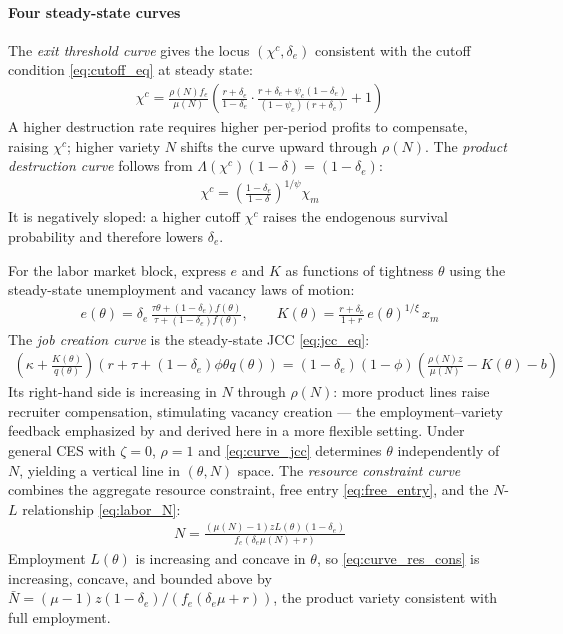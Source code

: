 \documentclass[authoryear, review, 12pt]{elsarticle}
\begin{document}
\paragraph{Four steady-state curves}
The \emph{exit threshold curve} gives the locus 
$(\chi^c, \delta_e)$ consistent with the cutoff 
condition \eqref{eq:cutoff_eq} at steady state:
\begin{align}\label{eq:exit_threshold_curve}
	\chi^c = \frac{\rho(N) f_e}{\mu(N)}
	\left(\frac{r+\delta_e}{1-\delta_e}
	\cdot\frac{r+\delta_e+\psi_c(1-\delta_e)}
	{(1-\psi_c)(r+\delta_e)}+1\right)
\end{align}
A higher destruction rate requires higher per-period 
profits to compensate, raising $\chi^c$; higher variety 
$N$ shifts the curve upward through $\rho(N)$. The 
\emph{product destruction curve} follows from 
$\Lambda(\chi^c)(1-\delta) = (1-\delta_e)$:
\begin{align}\label{eq:destruction_curve}
	\chi^c = \left(\frac{1-\delta_e}{1-\delta}
	\right)^{1/\psi}\chi_m
\end{align}
It is negatively sloped: a higher cutoff $\chi^c$ 
raises the endogenous survival probability and 
therefore lowers $\delta_e$.

For the labor market block, express $e$ and $K$ as 
functions of tightness $\theta$ using the steady-state 
unemployment and vacancy laws of motion:
\begin{align}\label{eq:e_theta}
	e(\theta) = \delta_e\,
	\frac{\tau\theta + (1-\delta_e)f(\theta)}
	{\tau + (1-\delta_e)f(\theta)}, \qquad
	K(\theta) = \frac{r+\delta_e}{1+r}\,
	e(\theta)^{1/\xi}\,x_m
\end{align}
The \emph{job creation curve} is the steady-state JCC 
\eqref{eq:jcc_eq}:
\begin{align}\label{eq:curve_jcc}
	\left(\kappa+\frac{K(\theta)}{q(\theta)}\right)
	\left(r+\tau+(1-\delta_e)\phi\theta q(\theta)\right)
	= (1-\delta_e)(1-\phi)
	\left(\frac{\rho(N)z}{\mu(N)}-K(\theta)-b\right)
\end{align}
Its right-hand side is increasing in $N$ through 
$\rho(N)$: more product lines raise recruiter 
compensation, stimulating vacancy creation --- the 
employment--variety feedback emphasized by 
\citet{schaal_2019} and derived here in a more 
flexible setting. Under general CES with $\zeta=0$, 
$\rho=1$ and \eqref{eq:curve_jcc} determines $\theta$ 
independently of $N$, yielding a vertical line in 
$(\theta,N)$ space. The \emph{resource constraint 
	curve} combines the aggregate resource constraint, 
free entry \eqref{eq:free_entry}, and the $N$-$L$ 
relationship \eqref{eq:labor_N}:
\begin{align}\label{eq:curve_res_cons}
	N = \frac{(\mu(N)-1)zL(\theta)(1-\delta_e)}
	{f_e(\delta_e\mu(N)+r)}
\end{align}
Employment $L(\theta)$ is increasing and concave in 
$\theta$, so \eqref{eq:curve_res_cons} is increasing, 
concave, and bounded above by 
$\bar{N}=(\mu-1)z(1-\delta_e)/(f_e(\delta_e\mu+r))$, 
the product variety consistent with full employment.
\end{document}
